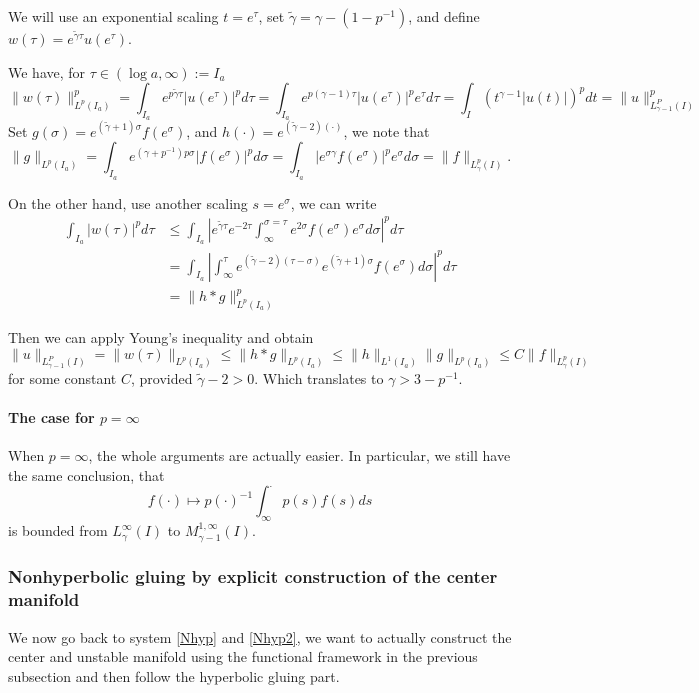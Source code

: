 \documentclass[letterpaper,11pt]{article}
\numberwithin{equation}{section}
\theoremstyle{plain}
\begin{document}
We will use an exponential scaling $t = e^\tau$, set $\tilde{\gamma} = \gamma-(1-p^{-1})$, and define $w(\tau) = e^{\tilde{\gamma}\tau}u(e^{\tau})$.

We have, for $\tau \in (\log a, \infty):=I_a$
\[
\| w(\tau)\|_{L^p(I_a)}^p = \int_{I_a} e^{p\tilde{\gamma}\tau}|u(e^\tau)|^pd\tau = \int_{I_a} e^{p(\gamma-1)\tau}|u(e^\tau)|^p e^{\tau}d\tau = \int_I (t^{\gamma-1}|u(t)|)^p dt = \|u\|_{L^P_{\gamma-1}(I)}^p
\]
Set $g(\sigma) = e^{(\tilde{\gamma}+1)\sigma}f(e^\sigma)$, and $h(\cdot) = e^{(\tilde{\gamma}-2)(\cdot)}$, we note that
\[
\| g\|_{L^p(I_a)} = \int_{I_a} e^{(\gamma+p^{-1})p\sigma} |f(e^\sigma) |^p d\sigma = \int_{I_a} |e^{\sigma \gamma}f(e^\sigma)|^p e^\sigma d\sigma = \| f\|_{L^p_\gamma(I)}.
\]


On the other hand, use another scaling $s = e^\sigma$, we can write
\begin{align*}
\int_{I_a} |w(\tau)|^p d\tau &\le \int_{I_a} \left|e^{\tilde{\gamma}\tau }e^{-2\tau}\int_\infty^{\sigma=\tau} e^{2\sigma}f(e^\sigma)e^{\sigma}d\sigma\right|^p d\tau  \\
&=\int_{I_a} \left| \int_\infty^\tau e^{(\tilde{\gamma}-2)(\tau-\sigma)}e^{(\tilde{\gamma}+1)\sigma}f(e^\sigma)d\sigma \right|^p d\tau\\
& = \| h \ast g \|^p_{L^p(I_a)}
\end{align*}

Then we can apply Young's inequality and obtain
\[
 \|u\|_{L^P_{\gamma-1}(I)} =\| w(\tau)\|_{L^p(I_a)}\le \| h \ast g \|_{L^p(I_a)} \le \|h\|_{L^1(I_a)} \|g\|_{L^p(I_a)} \le C \|f\|_{L^p_{\gamma}(I)}
\]
for some constant $C$, provided $\tilde{\gamma}-2>0$. Which translates to $\gamma > 3-p^{-1}$.


\paragraph{The case for $p=\infty$}

When $p=\infty$, the whole arguments are actually easier. In particular, we still have the same conclusion, that
\[
f(\cdot) \mapsto p(\cdot)^{-1}\int_\infty^{\cdot} p(s)f(s)ds
\]
is bounded from $L^\infty_\gamma(I)$ to $M^{1,\infty}_{\gamma-1}(I)$.

\subsubsection{Nonhyperbolic gluing by explicit construction of the center manifold}
We now go back to system \eqref{Nhyp} and \eqref{Nhyp2}, we want to actually construct the center and unstable manifold using the functional framework in the previous subsection and then follow the hyperbolic gluing part.
\end{document}
